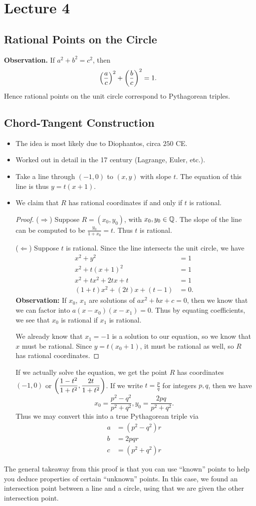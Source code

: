 \documentclass[class=article, crop=false]{standalone}
\begin{document}
  \section{Lecture 4}
  \subsection{Rational Points on the Circle}
  \textbf{Observation.} If $a^2 + b^2 = c^2$, then
  \[
    \left( \frac{a}{c} \right)^2 + \left( \frac{b}{c} \right)^2 = 1.
  \]
  Hence rational points on the unit circle correspond to Pythagorean triples.
  \subsection{Chord-Tangent Construction}
  \begin{itemize}
    \item The idea is most likely due to Diophantos, circa $250$ CE.
    \item Worked out in detail in the 17 century (Lagrange, Euler, etc.).
    \item Take a line through $(-1, 0)$ to $(x, y)$ with slope $t$. The equation of this line is thus $y = t(x + 1)$.
    \item We claim that $R$ has rational coordinates if and only if $t$ is rational.
    \begin{proof}
      ($\Rightarrow$) Suppose $R = (x_0, y_0)$, with $x_0, y_0\in\mathbb{Q}$. The slope of the line can be computed to be $\frac{y_0}{1 + x_0} = t$. Thus $t$ is rational. \par
      ($\Leftarrow$) Suppose $t$ is rational. Since the line intersects the unit circle, we have
      \begin{align*}
        x^2 + y^2 &= 1 \\
        x^2 + t(x + 1)^2 &= 1 \\
        x^2 + tx^2 + 2tx + t &= 1 \\
        (1 + t)x^2 + (2t)x + (t - 1) &= 0.
      \end{align*}
      \textbf{Observation:} If $x_0$, $x_1$ are solutions of $ax^2 + bx + c = 0$, then we know that we can factor into $a(x - x_0)(x - x_1) = 0$. Thus by equating coefficients, we see that $x_0$ is rational if $x_1$ is rational. \par
      We already know that $x_1 = -1$ is a solution to our equation, so we know that $x$ must be rational. Since $y = t(x_0 + 1)$, it must be rational as well, so $R$ has rational coordinates.
    \end{proof}
    If we actually solve the equation, we get the point $R$ has coordinates $(-1, 0)$ or $\displaystyle \left( \frac{1-t^2}{1+t^2}, \frac{2t}{1 + t^2} \right)$. If we write $t = \frac{p}{q}$ for integers $p, q$, then we have
    \[
      x_0 = \frac{p^2 - q^2}{p^2 + q^2}, y_0 = \frac{2pq}{p^2 + q^2}.
    \]
    Thus we may convert this into a true Pythagorean triple via
    \begin{align*}
      a &= (p^2 - q^2)r \\
      b &= 2pqr \\
      c &= (p^2 + q^2)r
    \end{align*}
  \end{itemize}
  \begin{note}{}
    The general takeaway from this proof is that you can use ``known'' points to help you deduce properties of certain ``unknown'' points. In this case, we found an intersection point between a line and a circle, using that we are given the other intersection point.
  \end{note}
\end{document}
